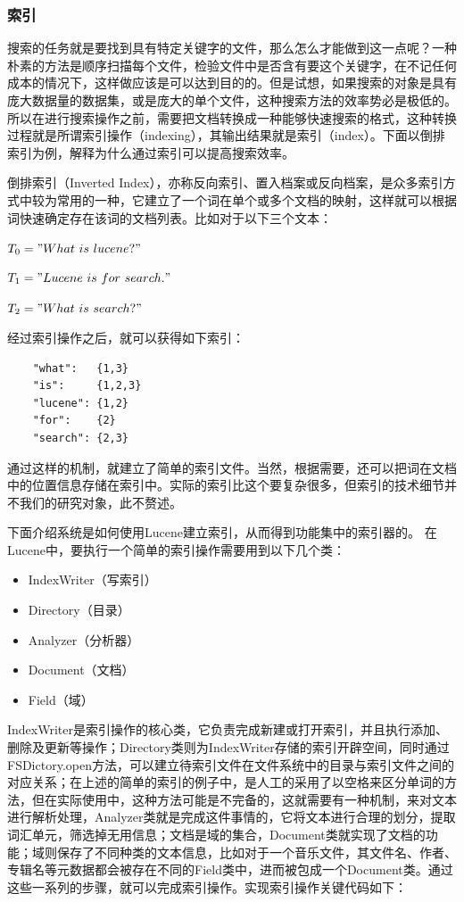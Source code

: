 \documentclass[12pt,a4paper]{article}
\begin{document}
		\subsubsection{索引}
	搜索的任务就是要找到具有特定关键字的文件，那么怎么才能做到这一点呢？一种朴素的方法是顺序扫描每个文件，检验文件中是否含有要这个关键字，在不记任何成本的情况下，这样做应该是可以达到目的的。但是试想，如果搜索的对象是具有庞大数据量的数据集，或是庞大的单个文件，这种搜索方法的效率势必是极低的。所以在进行搜索操作之前，需要把文档转换成一种能够快速搜索的格式，这种转换过程就是所谓索引操作（indexing），其输出结果就是索引（index）。下面以倒排索引为例，解释为什么通过索引可以提高搜索效率。
	
	倒排索引（Inverted Index），亦称反向索引、置入档案或反向档案，是众多索引方式中较为常用的一种，它建立了一个词在单个或多个文档的映射，这样就可以根据词快速确定存在该词的文档列表。比如对于以下三个文本：
	
	$T_0 = "What\ is\ lucene?"$
	
	$T_1 = "Lucene\ is\ for\ search."$
	
	$T_2 = "What\ is\ search?"$
	
	经过索引操作之后，就可以获得如下索引：
	\begin{lstlisting}
	"what":   {1,3}
	"is":     {1,2,3}
	"lucene": {1,2}
	"for":    {2}
	"search": {2,3}
	\end{lstlisting}
	
	通过这样的机制，就建立了简单的索引文件。当然，根据需要，还可以把词在文档中的位置信息存储在索引中。实际的索引比这个要复杂很多，但索引的技术细节并不我们的研究对象，此不赘述。
	
	下面介绍系统是如何使用Lucene建立索引，从而得到功能集中的索引器的。
	在Lucene中，要执行一个简单的索引操作需要用到以下几个类：
	
	\begin{itemize}
		\item IndexWriter（写索引）
		\item Directory（目录）
		\item Analyzer（分析器）
		\item Document（文档）
		\item Field（域）
	\end{itemize}
	
	IndexWriter是索引操作的核心类，它负责完成新建或打开索引，并且执行添加、删除及更新等操作；Directory类则为IndexWriter存储的索引开辟空间，同时通过FSDictory.open方法，可以建立待索引文件在文件系统中的目录与索引文件之间的对应关系；在上述的简单的索引的例子中，是人工的采用了以空格来区分单词的方法，但在实际使用中，这种方法可能是不完备的，这就需要有一种机制，来对文本进行解析处理，Analyzer类就是完成这件事情的，它将文本进行合理的划分，提取词汇单元，筛选掉无用信息；文档是域的集合，Document类就实现了文档的功能；域则保存了不同种类的文本信息，比如对于一个音乐文件，其文件名、作者、专辑名等元数据都会被存在不同的Field类中，进而被包成一个Document类。通过这些一系列的步骤，就可以完成索引操作。实现索引操作关键代码如下：
	
\end{document}
